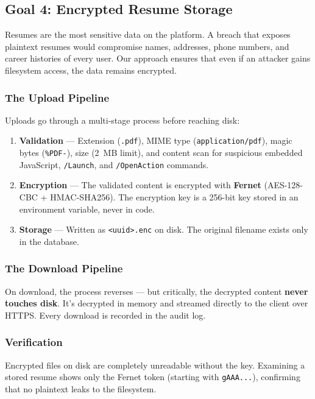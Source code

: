 \subsection{Goal 4: Encrypted Resume Storage}

Resumes are the most sensitive data on the platform. A breach that exposes plaintext resumes would compromise names, addresses, phone numbers, and career histories of every user. Our approach ensures that even if an attacker gains filesystem access, the data remains encrypted.

\subsubsection{The Upload Pipeline}

Uploads go through a multi-stage process before reaching disk:

\begin{enumerate}
    \item \textbf{Validation} — Extension (\texttt{.pdf}), MIME type (\texttt{application/pdf}), magic bytes (\texttt{\%PDF-}), size (2~MB limit), and content scan for suspicious embedded JavaScript, \texttt{/Launch}, and \texttt{/OpenAction} commands.
    \item \textbf{Encryption} — The validated content is encrypted with \textbf{Fernet} (AES-128-CBC + HMAC-SHA256). The encryption key is a 256-bit key stored in an environment variable, never in code.
    \item \textbf{Storage} — Written as \texttt{<uuid>.enc} on disk. The original filename exists only in the database.
\end{enumerate}

\subsubsection{The Download Pipeline}

On download, the process reverses — but critically, the decrypted content \textbf{never touches disk}. It's decrypted in memory and streamed directly to the client over HTTPS. Every download is recorded in the audit log.

\subsubsection{Verification}

Encrypted files on disk are completely unreadable without the key. Examining a stored resume shows only the Fernet token (starting with \texttt{gAAA...}), confirming that no plaintext leaks to the filesystem.

